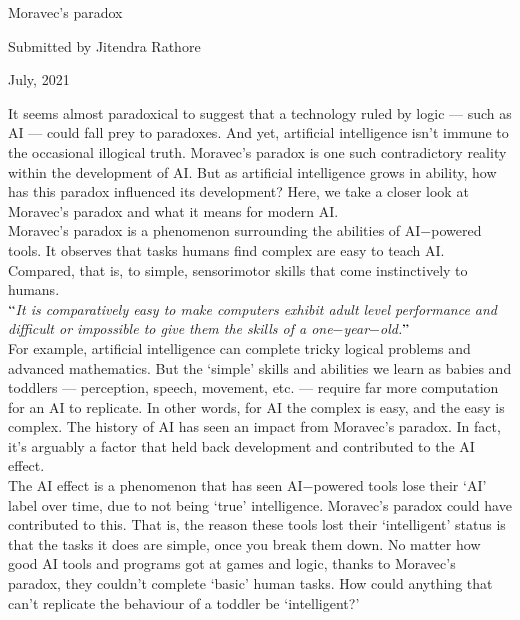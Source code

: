 \documentclass[12pt]{article}
\begin{document}
\begin{center}
{\LARGE Moravec's paradox}
\end{center}


\begin{center}
{\large Submitted by Jitendra Rathore}
\end{center}


\begin{center}
{\large July, 2021}
\end{center}


\vspace{1\baselineskip}
It seems almost paradoxical to suggest that a technology ruled by logic — such as AI — could fall prey to paradoxes. And yet, artificial intelligence isn’t immune to the occasional illogical truth. Moravec’s paradox is one such contradictory reality within the development of AI. But as artificial intelligence grows in ability, how has this paradox influenced its development? Here, we take a closer look at Moravec’s paradox and what it means for modern AI.
\\

Moravec’s paradox is a phenomenon surrounding the abilities of AI$-$powered tools. It observes that tasks humans find complex are easy to teach AI. Compared, that is, to simple, sensorimotor skills that come instinctively to humans.
\\

\textit{$``$It is comparatively easy to make computers exhibit adult level performance and difficult or impossible to give them the skills of a one$-$year$-$old.$"$}
\\

For example, artificial intelligence can complete tricky logical problems and advanced mathematics. But the ‘simple’ skills and abilities we learn as babies and toddlers — perception, speech, movement, etc. — require far more computation for an AI to replicate. In other words, for AI the complex is easy, and the easy is complex. The history of AI has seen an impact from Moravec’s paradox. In fact, it’s arguably a factor that held back development and contributed to the AI effect.
\\

The AI effect is a phenomenon that has seen AI$-$powered tools lose their ‘AI’ label over time, due to not being ‘true’ intelligence. Moravec’s paradox could have contributed to this. That is, the reason these tools lost their ‘intelligent’ status is that the tasks it does are simple, once you break them down.  No matter how good AI tools and programs got at games and logic, thanks to Moravec’s paradox, they couldn’t complete ‘basic’ human tasks. How could anything that can’t replicate the behaviour of a toddler be ‘intelligent?’
\\
\end{document}
